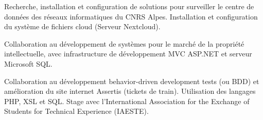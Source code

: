\documentclass[9pt,a4paper]{altacv}
\begin{document}

\begin{fullwidth}
\makecvheader
\end{fullwidth}



Recherche, installation et configuration de solutions pour surveiller le centre de données des réseaux informatiques du CNRS Alpes. Installation et configuration du système de fichiers cloud (Serveur Nextcloud).

\divider


Collaboration au développement de systèmes pour le marché de la propriété intellectuelle, avec infrastructure de développement MVC ASP.NET et serveur Microsoft SQL.

\divider


Collaboration au développement behavior-driven development tests (ou BDD) et amélioration du site internet Assertis (tickets de train). Utilisation des langages PHP, XSL et SQL. Stage avec l'International Association for the Exchange of Students for Technical Experience (IAESTE).
\end{document}

